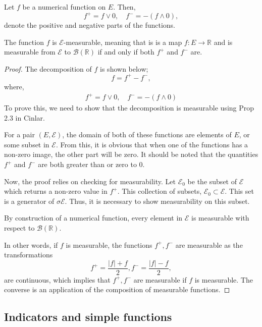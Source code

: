 Let $f$ be a numerical function on $E$. Then,
\begin{equation}
	f^+ = f \vee 0, \quad f^- = -(f \wedge 0),
\end{equation}
denote the positive and negative parts of the functions. 
\begin{definition}
	The function $f$ is $\mathcal{E}$-measurable, meaning that is is a map $f:E\rightarrow \mathbb{R}$ and is measurable from $\mathcal{E}$ to $\mathcal{B}(\mathbb{R})$ if and only if both $f^+$ and $f^-$ are. 
	\begin{proof}
		The decomposition of $f$ is shown below;
		\begin{equation}
			f = f^+ - f^-,
		\end{equation}
		where, 
		\begin{eqnarray}
			f^+ = f \vee 0, \quad f^- = -(f\wedge 0)
		\end{eqnarray}
		To prove this, we need to show that the decomposition is measurable using Prop 2.3 in Cinlar. 

		For a pair $(E, \mathcal{E})$, the domain of both of these functions are elements of $E$, or some subset in $\mathcal{E}$. From this, it is obvious that when one of the functions has a non-zero image, the other part will be zero. It should be noted that the quantities $f^+$ and $f^-$ are both greater than or zero to 0. 

		Now, the proof relies on checking for measurability. Let $\mathcal{E}_0$ be the subset of $\mathcal{E}$ which returns a non-zero value in $f^+$. This collection of subsets, $\mathcal{E}_0 \subset \mathcal{E}$. This set is a generator of $\sigma\mathcal{E}$. Thus, it is necessary to show measurability on this subset. 

		By construction of a numerical function, every element in $\mathcal{E}$ is measurable with respect to $\mathcal{B}(\mathbb{R})$.

		In other words, if $f$ is measurable, the functions $f^+, f^-$ are measurable as the transformations
		\begin{equation}
			f^+ = \frac{|f|+f}{2}, f^- = \frac{|f|-f}{2},
		\end{equation}
		are continuous, which implies that $f^+, f^-$ are measurable if $f$ is measurable. The converse is an application of the composition of measurable functions. 
	\end{proof}
\end{definition}

\subsection{Indicators and simple functions}

